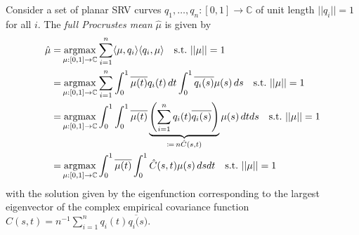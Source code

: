 Consider a set of planar SRV curves $q_1,\dots,q_n : [0,1] \rightarrow \mathbb{C}$ of unit length $||q_i|| = 1$ for all $i$.
The \textit{full Procrustes mean} $\hat{\mu}$ is given by
\begin{align*}
    \hat{\mu} =& \operatorname*{argmax}_{\mu:[0,1]\rightarrow\mathbb{C}} \sum_{i=1}^n \langle \mu, q_i \rangle \langle q_i, \mu \rangle
    \quad\text{s.t.}\,\, ||\mu|| = 1 \\
    =& \operatorname*{argmax}_{\mu:[0,1]\rightarrow\mathbb{C}} \sum_{i=1}^n
    \int_0^1 \overline{\mu(t)} q_i(t) \, dt \int_0^1 \overline{q_i(s)} \mu(s) \, ds
    \quad\text{s.t.}\,\, ||\mu|| = 1 \\
    =& \operatorname*{argmax}_{\mu:[0,1]\rightarrow\mathbb{C}}  \int_0^1 \int_0^1
    \overline{\mu(t)} \underbrace{\left( \sum_{i=1}^n q_i(t) \overline{q_i(s)} \right)}_{\coloneqq \, n \hat{C}(s,t)} \mu(s) \, dt ds
    \quad\text{s.t.}\,\, ||\mu|| = 1 \\
    =& \operatorname*{argmax}_{\mu:[0,1]\rightarrow\mathbb{C}} \int_0^1
    \overline{\mu(t)} \int_0^1 \hat{C}(s,t) \mu(s) \, ds dt
    \quad\text{s.t.}\,\, ||\mu|| = 1
\end{align*}
with the solution given by the eigenfunction corresponding to the largest eigenvector of the complex empirical covariance function $\hat{C}(s,t) = n^{-1} \sum_{i=1}^n q_i(t) \overline{q_i(s})$.



